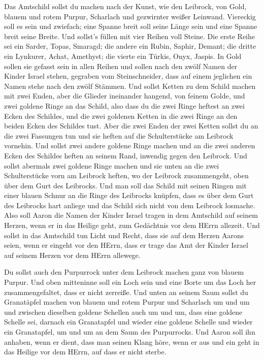  Das Amtschild sollst du machen nach der Kunst, wie den
Leibrock, von Gold, blauem und rotem Purpur, Scharlach und gezwirnter
weißer Leinwand.  Viereckig soll es sein und zwiefach; eine
Spanne breit soll seine Länge sein und eine Spanne breit seine Breite.
 Und sollst's füllen mit vier Reihen voll Steine. Die erste
Reihe sei ein Sarder, Topas, Smaragd;  die andere ein
Rubin, Saphir, Demant;  die dritte ein Lynkurer, Achat,
Amethyst;  die vierte ein Türkis, Onyx, Jaspis. In Gold
sollen sie gefasst sein in allen Reihen  und sollen nach
den zwölf Namen der Kinder Israel stehen, gegraben vom Steinschneider,
dass auf einem jeglichen ein Namen stehe nach den zwölf Stämmen.
 Und sollst Ketten zu dem Schild machen mit zwei Enden,
aber die Glieder ineinander hangend, von feinem Golde,  und
zwei goldene Ringe an das Schild, also dass du die zwei Ringe heftest an
zwei Ecken des Schildes,  und die zwei goldenen Ketten in
die zwei Ringe an den beiden Ecken des Schildes tust.  Aber
die zwei Enden der zwei Ketten sollst du an die zwei Fassungen tun und
sie heften auf die Schulterstücke am Leibrock vornehin. 
Und sollst zwei andere goldene Ringe machen und an die zwei anderen
Ecken des Schildes heften an seinem Rand, inwendig gegen den Leibrock.
 Und sollst abermals zwei goldene Ringe machen und sie
unten an die zwei Schulterstücke vorn am Leibrock heften, wo der
Leibrock zusammengeht, oben über dem Gurt des Leibrocks. 
Und man soll das Schild mit seinen Ringen mit einer blauen Schnur an die
Ringe des Leibrocks knüpfen, dass es über dem Gurt des Leibrocks hart
anliege und das Schild sich nicht von dem Leibrock losmache.
 Also soll Aaron die Namen der Kinder Israel tragen in dem
Amtschild auf seinem Herzen, wenn er in das Heilige geht, zum Gedächtnis
vor dem HErrn allezeit.  Und sollst in das Amtschild tun
Licht und Recht, dass sie auf dem Herzen Aarons seien, wenn er eingeht
vor den HErrn, dass er trage das Amt der Kinder Israel auf seinem Herzen
vor dem HErrn allewege.

 Du sollst auch den Purpurrock unter dem Leibrock machen
ganz von blauem Purpur.  Und oben mitteninne soll ein Loch
sein und eine Borte um das Loch her zusammengefaltet, dass er nicht
zerreiße.  Und unten an seinem Saum sollst du Granatäpfel
machen von blauem und rotem Purpur und Scharlach um und um und zwischen
dieselben goldene Schellen auch um und um,  dass eine
goldene Schelle sei, darnach ein Granatapfel und wieder eine goldene
Schelle und wieder ein Granatapfel, um und um an dem Saum des
Purpurrocks.  Und Aaron soll ihn anhaben, wenn er dient,
dass man seinen Klang höre, wenn er aus und ein geht in das Heilige vor
dem HErrn, auf dass er nicht sterbe.

